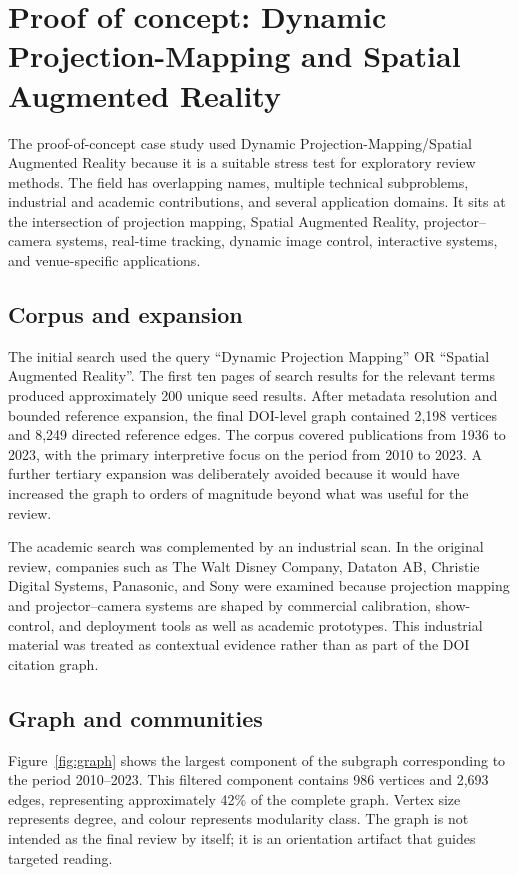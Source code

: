 \documentclass[11pt,a4paper]{article}
\newcommand{\dpm}{Dynamic Projection-Mapping}
\newcommand{\sar}{Spatial Augmented Reality}
\newcommand{\procam}{projector--camera}
\begin{document}
\section{Proof of concept: \dpm{} and \sar{}}

The proof-of-concept case study used \dpm{}/\sar{} because it is a suitable stress test for exploratory review methods. The field has overlapping names, multiple technical subproblems, industrial and academic contributions, and several application domains. It sits at the intersection of projection mapping, \sar{}, \procam{} systems, real-time tracking, dynamic image control, interactive systems, and venue-specific applications.

\subsection{Corpus and expansion}

The initial search used the query ``Dynamic Projection Mapping'' OR ``Spatial Augmented Reality''. The first ten pages of search results for the relevant terms produced approximately 200 unique seed results. After metadata resolution and bounded reference expansion, the final DOI-level graph contained 2,198 vertices and 8,249 directed reference edges. The corpus covered publications from 1936 to 2023, with the primary interpretive focus on the period from 2010 to 2023. A further tertiary expansion was deliberately avoided because it would have increased the graph to orders of magnitude beyond what was useful for the review.

The academic search was complemented by an industrial scan. In the original review, companies such as The Walt Disney Company, Dataton AB, Christie Digital Systems, Panasonic, and Sony were examined because projection mapping and \procam{} systems are shaped by commercial calibration, show-control, and deployment tools as well as academic prototypes. This industrial material was treated as contextual evidence rather than as part of the DOI citation graph.

\subsection{Graph and communities}

Figure~\ref{fig:graph} shows the largest component of the subgraph corresponding to the period 2010--2023. This filtered component contains 986 vertices and 2,693 edges, representing approximately 42\% of the complete graph. Vertex size represents degree, and colour represents modularity class. The graph is not intended as the final review by itself; it is an orientation artifact that guides targeted reading.
\end{document}
